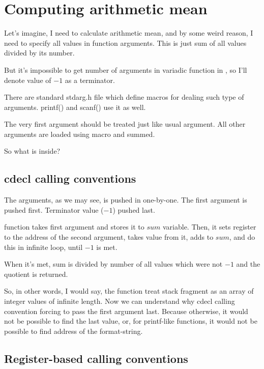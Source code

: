 \section{Computing arithmetic mean}

Let's imagine, I need to calculate arithmetic mean, and by some weird reason, 
I need to specify all values in function arguments.
This is just sum of all values divided by its number.

But it's impossible to get number of arguments in variadic function in \CCpp, so I'll denote 
value of $-1$ as a terminator.

There are standard stdarg.h file which define macros for dealing such type of arguments.
printf() and scanf() use it as well.



The very first argument should be treated just like usual argument.
All other arguments are loaded using  macro and summed.

So what is inside?

\subsection{cdecl calling conventions}



The arguments, as we may see, is pushed in \main one-by-one.
The first argument is pushed first. Terminator value ($-1$) pushed last.

 function takes first argument and stores it to $sum$ variable.
Then, it sets \EDX register to the address of the second argument, takes value from it, adds to $sum$,
and do this in infinite loop, until $-1$ is met.

When it's met, sum is divided by number of all values which were not $-1$ and the \gls{quotient} is returned.

So, in other words, I would say, the function treat stack fragment as an array of integer values of infinite
length.
Now we can understand why cdecl calling convention forcing to pass the first argument last. 
Because otherwise, it would not be possible to find the last value, or, for printf-like functions, it would not be
possible to find address of the format-string.

\subsection{Register-based calling conventions}

